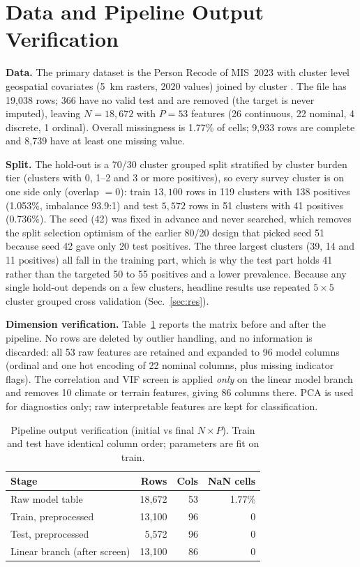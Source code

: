 \documentclass[11pt]{article}
\begin{document}
\section{Data and Pipeline Output Verification}
\textbf{Data.} The primary dataset is the Person Recode of MIS~2023 with cluster level geospatial covariates (5~km rasters, 2020 values) joined by cluster \cite{dhsguide}. The file has 19{,}038 rows; 366 have no valid test and are removed (the target is never imputed), leaving $N=18{,}672$ with $P=53$ features (26 continuous, 22 nominal, 4 discrete, 1 ordinal). Overall missingness is 1.77\% of cells; 9{,}933 rows are complete and 8{,}739 have at least one missing value.

\textbf{Split.} The hold-out is a 70/30 cluster grouped split stratified by cluster burden tier (clusters with 0, 1--2 and 3 or more positives), so every survey cluster is on one side only (overlap $=0$): train $13{,}100$ rows in 119 clusters with 138 positives (1.053\%, imbalance 93.9:1) and test $5{,}572$ rows in 51 clusters with 41 positives (0.736\%). The seed (42) was fixed in advance and never searched, which removes the split selection optimism of the earlier 80/20 design that picked seed 51 because seed 42 gave only 20 test positives. The three largest clusters (39, 14 and 11 positives) all fall in the training part, which is why the test part holds 41 rather than the targeted 50 to 55 positives and a lower prevalence. Because any single hold-out depends on a few clusters, headline results use repeated $5\times5$ cluster grouped cross validation (Sec.~\ref{sec:res}).

\textbf{Dimension verification.} Table~\ref{tab:dims} reports the matrix before and after the pipeline. No rows are deleted by outlier handling, and no information is discarded: all 53 raw features are retained and expanded to 96 model columns (ordinal and one hot encoding of 22 nominal columns, plus missing indicator flags). The correlation and VIF screen is applied \emph{only} on the linear model branch and removes 10 climate or terrain features, giving 86 columns there. PCA is used for diagnostics only; raw interpretable features are kept for classification.

\begin{table}[t]
\centering\small
\begin{tabular}{lrrr}
\toprule
Stage & Rows & Cols & NaN cells\\
\midrule
Raw model table & 18{,}672 & 53 & 1.77\%\\
Train, preprocessed & 13{,}100 & 96 & 0\\
Test, preprocessed & 5{,}572 & 96 & 0\\
Linear branch (after screen) & 13{,}100 & 86 & 0\\
\bottomrule
\end{tabular}
\caption{Pipeline output verification (initial vs final $N\times P$). Train and test have identical column order; parameters are fit on train.}
\label{tab:dims}
\end{table}
\end{document}
